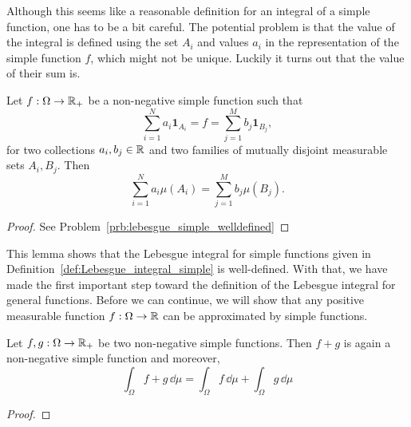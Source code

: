 Although this seems like a reasonable definition for an integral of a simple function, one has to be a bit careful. The potential problem is that the value of the integral is defined using the set $A_i$ and values $a_i$ in the representation of the simple function $f$, which might not be unique. Luckily it turns out that the value of their sum is.

\begin{lemma}\label{lem:lebesgue_simple_welldefined}
Let $f: \Omega \to \mathbb R_+$ be a non-negative simple function such that
\[
	\sum_{i = 1}^N a_i \mathbf{1}_{A_i} = f = \sum_{j = 1}^M b_j \mathbf{1}_{B_j},
\]
for two collections $a_i, b_j \in \mathbb R$ and two families of mutually disjoint measurable sets $A_i, B_j$. Then
\[
	\sum_{i = 1}^N a_i \mu(A_i)= \sum_{j = 1}^M b_j \mu(B_j).
\]
\end{lemma}

\begin{proof}
See Problem~\ref{prb:lebesgue_simple_welldefined}
\end{proof}

This lemma shows that the Lebesgue integral for simple functions given in Definition~\ref{def:Lebesgue_integral_simple} is well-defined. With that, we have made the first important step toward the definition of the Lebesgue integral for general functions. Before we can continue, we will show that any positive measurable function $f : \Omega \to \mathbb R$ can be approximated by simple functions.

\begin{lemma}\label{lem:linearity_lebesgue_simple}
Let $f, g: \Omega \to \mathbb R_+$ be two non-negative simple functions. Then $f+g$ is again a non-negative simple function and moreover,
\[
	\int_\Omega f + g \, \dd \mu = \int_\Omega f\, \dd \mu + \int_\Omega g\, \dd \mu
\]
\end{lemma}

\begin{proof}

\end{proof}

%

